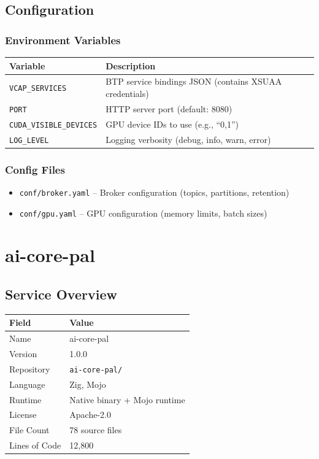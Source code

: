 \documentclass[11pt,a4paper]{article}
\begin{document}
\subsection{Configuration}

\subsubsection{Environment Variables}
\begin{tabular}{@{}L{4.5cm}L{9cm}@{}}
\toprule
\textbf{Variable} & \textbf{Description} \\
\midrule
\texttt{VCAP\_SERVICES} & BTP service bindings JSON (contains XSUAA credentials) \\
\texttt{PORT} & HTTP server port (default: 8080) \\
\texttt{CUDA\_VISIBLE\_DEVICES} & GPU device IDs to use (e.g., ``0,1'') \\
\texttt{LOG\_LEVEL} & Logging verbosity (debug, info, warn, error) \\
\bottomrule
\end{tabular}

\subsubsection{Config Files}
\begin{itemize}[noitemsep]
    \item \texttt{conf/broker.yaml} -- Broker configuration (topics, partitions, retention)
    \item \texttt{conf/gpu.yaml} -- GPU configuration (memory limits, batch sizes)
\end{itemize}

\newpage

\section{ai-core-pal}

\subsection{Service Overview}

\begin{tabular}{@{}L{4cm}L{10cm}@{}}
\toprule
\textbf{Field} & \textbf{Value} \\
\midrule
Name & ai-core-pal \\
Version & 1.0.0 \\
Repository & \texttt{ai-core-pal/} \\
Language & Zig, Mojo \\
Runtime & Native binary + Mojo runtime \\
License & Apache-2.0 \\
File Count & 78 source files \\
Lines of Code & 12,800 \\
\bottomrule
\end{tabular}
\end{document}
